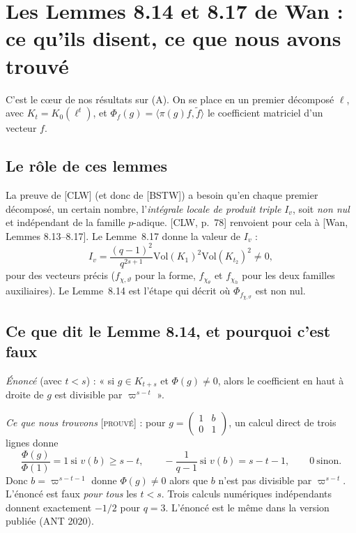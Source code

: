 \documentclass[11pt]{amsart}
\newcommand{\stat}[1]{\textsc{[#1]}}
\newcommand{\Vol}{\mathrm{Vol}}
\begin{document}
\section{Les Lemmes 8.14 et 8.17 de Wan : ce qu'ils disent, ce que nous avons trouvé}
C'est le cœur de nos résultats sur (A). On se place en un premier décomposé $\ell$, avec $K_t=K_0(\ell^t)$, et $\Phi_f(g)=\langle\pi(g)f,\tilde f\rangle$ le coefficient matriciel d'un vecteur $f$.

\subsection*{Le rôle de ces lemmes}
La preuve de [CLW] (et donc de [BSTW]) a besoin qu'en chaque premier décomposé, un certain nombre, l'\emph{intégrale locale de produit triple} $I_v$, soit \emph{non nul} et indépendant de la famille $p$-adique. [CLW, p.~78] renvoient pour cela à [Wan, Lemmes 8.13--8.17]. Le Lemme~8.17 donne la valeur de $I_v$ :
\[
I_v=\frac{(q-1)^2}{q^{2s+1}}\Vol(K_1)^2\Vol(K_{t_2})^2\neq0,
\]
pour des vecteurs précis ($f_{\chi,\vartheta}$ pour la forme, $f_{\chi_\theta}$ et $f_{\chi_h}$ pour les deux familles auxiliaires). Le Lemme~8.14 est l'étape qui décrit où $\Phi_{f_{\chi,\vartheta}}$ est non nul.

\subsection*{Ce que dit le Lemme 8.14, et pourquoi c'est faux}
\emph{Énoncé} (avec $t<s$) : « si $g\in K_{t+s}$ et $\Phi(g)\neq0$, alors le coefficient en haut à droite de $g$ est divisible par $\varpi^{s-t}$ ».

\emph{Ce que nous trouvons} \stat{prouvé} : pour $g=\begin{pmatrix}1&b\\0&1\end{pmatrix}$, un calcul direct de trois lignes donne
\[
\frac{\Phi(g)}{\Phi(1)}=1\ \text{si } v(b)\ge s-t,\qquad -\frac{1}{q-1}\ \text{si } v(b)=s-t-1,\qquad 0\ \text{sinon}.
\]
Donc $b=\varpi^{s-t-1}$ donne $\Phi(g)\neq0$ alors que $b$ n'est pas divisible par $\varpi^{s-t}$. L'énoncé est faux \emph{pour tous} les $t<s$. Trois calculs numériques indépendants donnent exactement $-1/2$ pour $q=3$. L'énoncé est le même dans la version publiée (ANT 2020).
\end{document}
